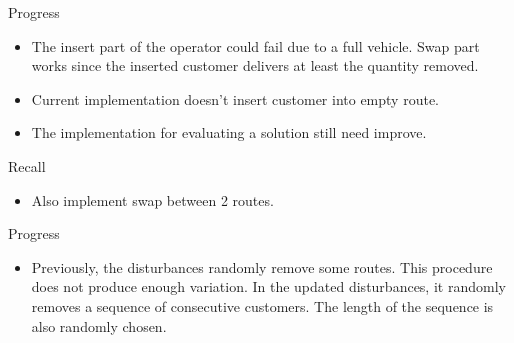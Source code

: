 \documentclass{beamer}
\begin{document}
\begin{frame}{Progress}
\begin{itemize}
    \item The insert part of the operator could fail due to a full vehicle. Swap part works since the inserted customer delivers at least the quantity removed.
    \item Current implementation doesn't insert customer into empty route.
    \item The implementation for evaluating a solution still need improve.
\end{itemize}
\end{frame}


\begin{frame}{Recall}
\begin{itemize}
    \item Also implement swap between 2 routes.
\end{itemize}
\end{frame}

\begin{frame}{Progress}
\begin{itemize}
    \item Previously, the disturbances randomly remove some routes. This procedure does not produce enough variation. In the updated disturbances, it randomly removes a sequence of consecutive customers. The length of the sequence is also randomly chosen.
\end{itemize}
\end{frame}
\end{document}
